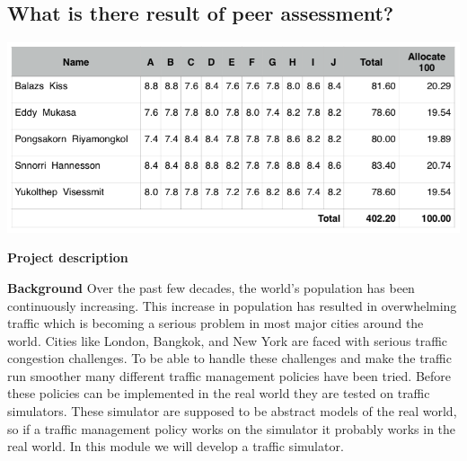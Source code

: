 \documentclass[11pt]{article}
\begin{document}
	\subsection{What is there result of peer assessment?}
	\begin{center}			
			\includegraphics[scale = 0.4]{Figure04}
	\end{center}
	

\newpage	




\appendix %






\textbf{Project description}


\textbf{Background}
Over the past few decades, the world's population has been continuously increasing. This increase in population has resulted in overwhelming traffic which is becoming a serious problem in most major cities around the world. Cities like London, Bangkok, and New York are faced with serious traffic congestion challenges. To be able to handle these challenges and make the traffic run smoother many different traffic management policies have been tried. Before these policies can be implemented in the real world they are tested on traffic simulators. These simulator are supposed to be abstract models of the real world, so if a traffic management policy works on the simulator it probably works in the real world. In this module we will develop a traffic simulator.
\end{document}
